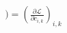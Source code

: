 \documentclass[preview]{standalone}
\begin{document}
\begin{align*}
) = ( \frac{\partial \mathcal{L}}{\partial c_{i,k}} )_{i,k}
\end{align*}
\end{document}
